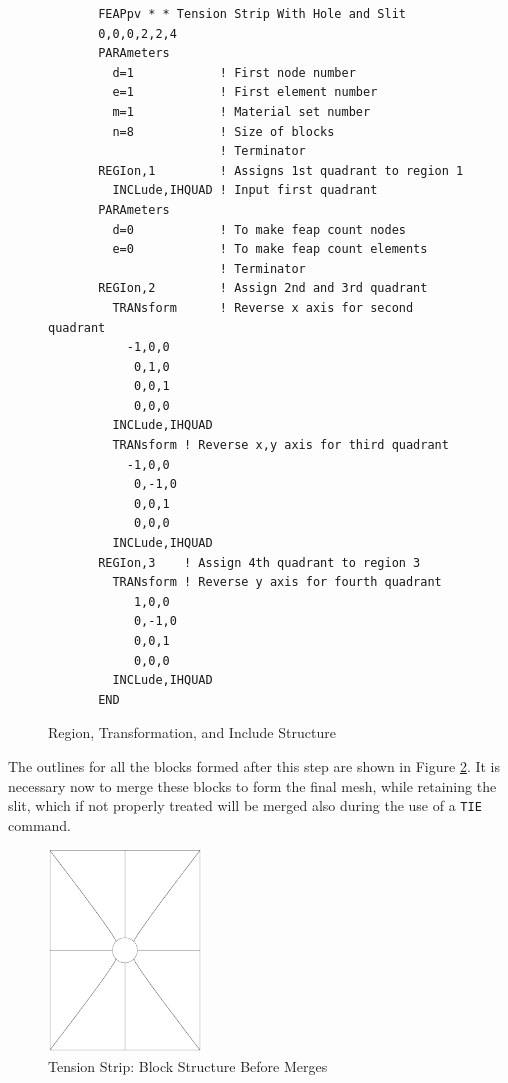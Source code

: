 \begin{figure}
\begin{verbatim}
       FEAPpv * * Tension Strip With Hole and Slit
       0,0,0,2,2,4
       PARAmeters
         d=1            ! First node number
         e=1            ! First element number
         m=1            ! Material set number
         n=8            ! Size of blocks
                        ! Terminator
       REGIon,1         ! Assigns 1st quadrant to region 1
         INCLude,IHQUAD ! Input first quadrant
       PARAmeters
         d=0            ! To make feap count nodes
         e=0            ! To make feap count elements
                        ! Terminator
       REGIon,2         ! Assign 2nd and 3rd quadrant
         TRANsform      ! Reverse x axis for second quadrant
           -1,0,0
            0,1,0
            0,0,1
            0,0,0
         INCLude,IHQUAD
         TRANsform ! Reverse x,y axis for third quadrant
           -1,0,0
            0,-1,0
            0,0,1
            0,0,0
         INCLude,IHQUAD
       REGIon,3    ! Assign 4th quadrant to region 3
         TRANsform ! Reverse y axis for fourth quadrant
            1,0,0
            0,-1,0
            0,0,1
            0,0,0
         INCLude,IHQUAD
       END
\end{verbatim}
\caption{Region, Transformation, and Include Structure}
\label{fig10}
\end{figure}

The outlines for all the blocks formed after this step are shown in
Figure \ref{fig11}.  It is necessary now to merge these blocks to form the
final mesh, while retaining the slit, which if not properly treated
will be merged also during the use of a {\tt TIE} command.

\begin{figure}[ht!]
\centerline {\hfil \includegraphics[width=1.6in]{figs/figo1} \hfil}
\caption{Tension Strip: Block Structure Before Merges}
\label{fig11}
\end{figure}

